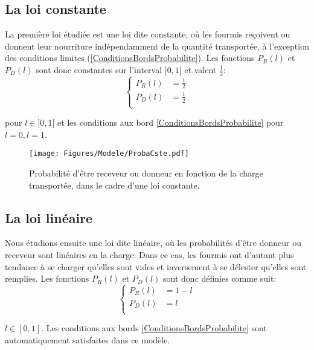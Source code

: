 \subsection{La loi constante}

La première loi étudiée est une loi dite constante, où les fourmis reçoivent ou donnent leur nourriture indépendamment de la quantité transportée, à l'exception des conditions limites (\ref{ConditionsBordsProbabilite}). Les fonctions $P_R(l)$ et $P_D(l)$ sont donc constantes sur l'interval $]0,1[$ et valent $\frac{1}{2}$:\\

\begin{equation}
\left \{
\begin{aligned}
P_R (l) &= \frac{1}{2}\\
P_D (l) &= \frac{1}{2}\\
\end{aligned}
\right.
\label{PRCste}
\end{equation}

pour $l\in]0,1[$ et les conditions aux bord \ref{ConditionsBordsProbabilite} pour $l=0, l=1$.

\begin{figure}[h]
\centering
\texttt{[image: Figures/Modele/ProbaCste.pdf]}
\caption{Probabilité d'être receveur ou donneur en fonction de la charge transportée, dans le cadre d'une loi constante.}
\label{ProbaCste}
\end{figure}

\subsection{La loi linéaire}
Nous étudions ensuite une loi dite linéaire, où les probabilités d'être donneur ou receveur sont linéaires en la charge. Dans ce cas, les fourmis ont d'autant plus tendance à se charger qu'elles sont vides et inversement à se délester qu'elles sont remplies. Les fonctions $P_R(l)$ et $P_D(l)$ sont donc définies comme suit:
\begin{equation}
\left \{
\begin{aligned}
P_R (l) &= 1-l\\
P_D (l) &= l\\
\end{aligned}
\right.
\label{PRLin}
\end{equation}

$l\in[0,1]$. Les conditions aux bords \ref{ConditionsBordsProbabilite} sont automatiquement satisfaites dans ce modèle.

